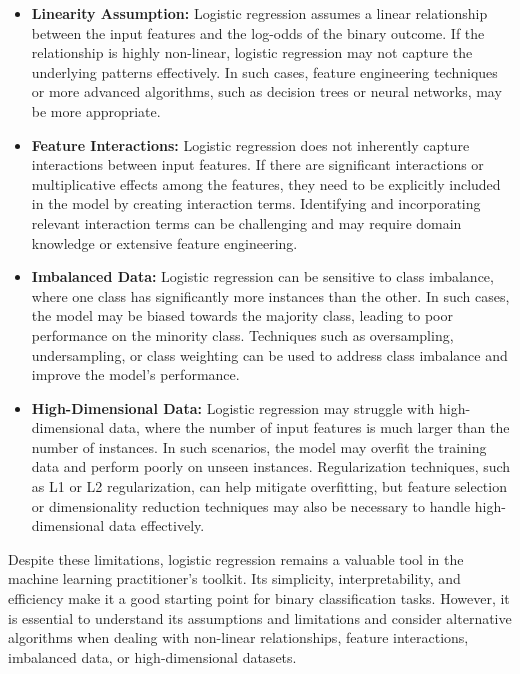 \documentclass[letterpaper,10pt]{article}
\begin{document}
\begin{itemize}
  \item \textbf{Linearity Assumption:} Logistic regression assumes a linear relationship between the input features and the log-odds of the binary outcome. If the relationship is highly non-linear, logistic regression may not capture the underlying patterns effectively. In such cases, feature engineering techniques or more advanced algorithms, such as decision trees or neural networks, may be more appropriate.

  \item \textbf{Feature Interactions:} Logistic regression does not inherently capture interactions between input features. If there are significant interactions or multiplicative effects among the features, they need to be explicitly included in the model by creating interaction terms. Identifying and incorporating relevant interaction terms can be challenging and may require domain knowledge or extensive feature engineering.

  \item \textbf{Imbalanced Data:} Logistic regression can be sensitive to class imbalance, where one class has significantly more instances than the other. In such cases, the model may be biased towards the majority class, leading to poor performance on the minority class. Techniques such as oversampling, undersampling, or class weighting can be used to address class imbalance and improve the model's performance.

  \item \textbf{High-Dimensional Data:} Logistic regression may struggle with high-dimensional data, where the number of input features is much larger than the number of instances. In such scenarios, the model may overfit the training data and perform poorly on unseen instances. Regularization techniques, such as L1 or L2 regularization, can help mitigate overfitting, but feature selection or dimensionality reduction techniques may also be necessary to handle high-dimensional data effectively.
\end{itemize}

Despite these limitations, logistic regression remains a valuable tool in the machine learning practitioner's toolkit. Its simplicity, interpretability, and efficiency make it a good starting point for binary classification tasks. However, it is essential to understand its assumptions and limitations and consider alternative algorithms when dealing with non-linear relationships, feature interactions, imbalanced data, or high-dimensional datasets.
\end{document}

